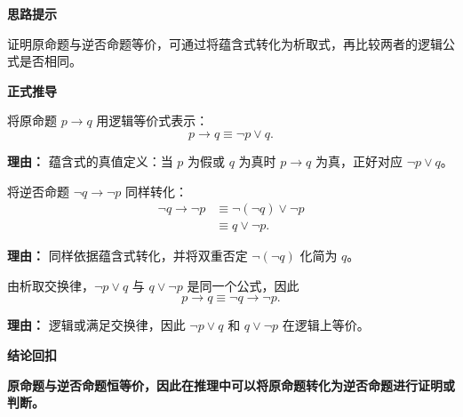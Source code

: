 \begin{proofbox}

	\textbf{\textcolor{CProof}{思路提示}}

	证明原命题与逆否命题等价，可通过将蕴含式转化为析取式，再比较两者的逻辑公式是否相同。

	\medskip
	\textbf{\textcolor{CProof}{正式推导}}
	\begin{description}[style=nextline, leftmargin=2.8em, labelsep=0.5em, itemsep=0.55em]
		\item[\textbf{步骤一（蕴含转化）：}] 将原命题 $p\to q$ 用逻辑等价式表示：
			\[
				p\to q \equiv \lnot p \lor q.
			\]
			\par\textbf{理由：}
			蕴含式的真值定义：当 $p$ 为假或 $q$ 为真时 $p\to q$ 为真，正好对应 $\lnot p\lor q$。

		\item[\textbf{步骤二（逆否转化）：}] 将逆否命题 $\lnot q\to\lnot p$ 同样转化：
			\[
				\begin{aligned}
					\lnot q\to\lnot p &\equiv \lnot(\lnot q) \lor \lnot p \\
					&\equiv q \lor \lnot p.
			\end{aligned}
			\]
			\par\textbf{理由：}
			同样依据蕴含式转化，并将双重否定 $\lnot(\lnot q)$ 化简为 $q$。

		\item[\textbf{步骤三（对比等价）：}] 由析取交换律，$\lnot p\lor q$ 与 $q\lor\lnot p$ 是同一个公式，因此
			\[
				p\to q \equiv \lnot q\to\lnot p.
			\]
			\par\textbf{理由：}
			逻辑或满足交换律，因此 $\lnot p\lor q$ 和 $q\lor\lnot p$ 在逻辑上等价。
	\end{description}

	\medskip
	\textbf{\textcolor{CProof}{结论回扣}}

	\textbf{原命题与逆否命题恒等价，因此在推理中可以将原命题转化为逆否命题进行证明或判断。}
\end{proofbox}

